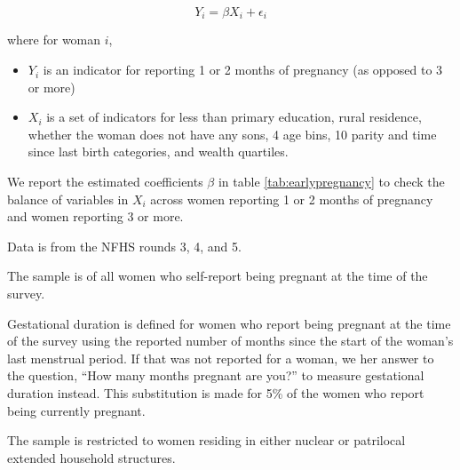 \documentclass[12pt]{article}
\begin{document}
\begin{equation}
Y_i=\beta X_i+\epsilon_i
\end{equation}

where for woman $i$, 
\begin{itemize}
    \item $Y_i$ is an indicator for reporting 1 or 2 months of pregnancy (as opposed to 3 or more)
    \item $X_i$ is a set of indicators for less than primary education, rural residence, whether the woman does not have any sons, 4 age bins, 10 parity and time since last birth categories, and wealth quartiles. 
\end{itemize}

We report the estimated coefficients $\beta$ in table \ref{tab:earlypregnancy} to check the balance of variables in $X_i$ across women reporting 1 or 2 months of pregnancy and women reporting 3 or more.

\begin{table}[H]
    \centering
    \begin{threeparttable}[t]
        \caption{:  Predicting early pregnancy}

        \label{tab:earlypregnancy}
        \scriptsize
        \setlength{\tabcolsep}{10pt}
        \renewcommand{\arraystretch}{1}

        

        \begin{tablenotes}
            \item Data is from the NFHS rounds 3, 4, and 5.
            \item The sample is of all women who self-report being pregnant at the time of the survey. 
            \item Gestational duration is defined for women who report being pregnant at the time of the survey using the reported number of months since the start of the woman's last menstrual period.  If that was not reported for a woman, we her answer to the question, ``How many months pregnant are you?'' to measure gestational duration instead. This substitution is made for 5\% of the women who report being currently pregnant. 
            \item The sample is restricted to women residing in either nuclear or patrilocal extended household structures. 
            
        \end{tablenotes}
    \end{threeparttable}
\end{table}
\end{document}
